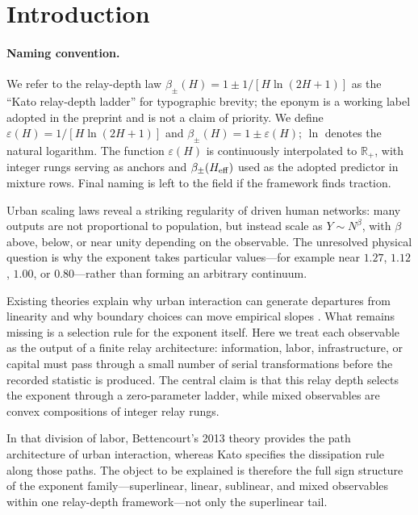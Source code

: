 \endgroup
\endgroup


\clearpage
{}
\doublespacing

\section{Introduction}


\paragraph{Naming convention.} 
We refer to the relay-depth law $\beta_\pm(H)=1\pm 1/[H\ln(2H+1)]$ as the ``Kato relay-depth ladder'' for typographic brevity; the eponym is a working label adopted in the preprint and is not a claim of priority. We define $\varepsilon(H) = 1/[H\ln(2H+1)]$ and $\beta_{\pm}(H) = 1 \pm \varepsilon(H)$; $\ln$ denotes the natural logarithm. The function $\varepsilon(H)$ is continuously interpolated to $\mathbb{R}_+$, with integer rungs serving as anchors and $\beta_{\pm}(H_{\rm eff})$ used as the adopted predictor in mixture rows. Final naming is left to the field if the framework finds traction.

Urban scaling laws reveal a striking regularity of driven human networks:
many outputs are not proportional to population, but instead scale as
\(Y\sim N^\beta\), with \(\beta\) above, below, or near unity depending on the
observable. The unresolved physical question is why the exponent takes
particular values---for example near \(1.27\), \(1.12\), \(1.00\), or
\(0.80\)---rather than forming an arbitrary continuum.

Existing theories explain why urban interaction can generate departures from
linearity and why boundary choices can move empirical slopes
\cite{Bettencourt2007,Bettencourt2013,Arcaute2015}. What remains missing is
a selection rule for the exponent itself. Here we treat each observable as the
output of a finite relay architecture: information, labor, infrastructure, or
capital must pass through a small number of serial transformations before the
recorded statistic is produced. The central claim is that this relay depth
selects the exponent through a zero-parameter ladder, while mixed observables
are convex compositions of integer relay rungs.

In that division of labor, Bettencourt's 2013 theory provides the path
architecture of urban interaction, whereas Kato specifies the dissipation rule
along those paths. The object to be explained is therefore the full sign
structure of the exponent family---superlinear, linear, sublinear, and mixed
observables within one relay-depth framework---not only the superlinear tail.

